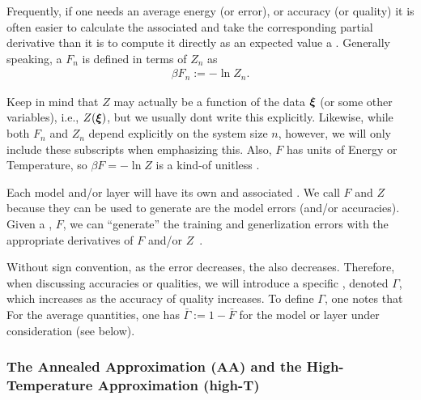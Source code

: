 
Frequently, if one needs an average energy (or error), or accuracy (or quality)
it is often easier to calculate the associated \FreeEnergy and take the corresponding partial derivative
than it is to compute it directly as an expected value a \ThermalAverage.
Generally speaking, a \FreeEnergy $F_n$ is defined in terms of $Z_{n}$ as
\begin{align}
\label{eqn:F}
\beta F_n:=-\ln Z_{n}.
\end{align}


Keep in mind that $Z$ may actually be a function of the data $\boldsymbol{\xi}$ (or some other variables),
i.e., $Z(\boldsymbol{\xi})$, but we usually dont write this explicitly.
Likewise, while  both $F_n$ and $Z_n$ depend explicitly on the system size $n$, however,
we will only include these subscripts when emphasizing this.
Also, $F$ has units of Energy or Temperature, so $\beta F=-\ln Z$ is a kind-of unitless \FreeEnergy.

Each model and/or layer will have its own \PartitionFunction and associated \GeneratingFunctions.
We call $F$ and $Z$ \emph{\GeneratingFunctions} because they can be used to generate are the model errors (and/or accuracies). 
Given a \FreeEnergy, $F$, we can ``generate'' the training and generlization errors with the appropriate derivatives of $F$ and/or $Z$~\cite{LTS90, Solla2023}.

Without sign convention,  as the error decreases, the \FreeEnergy also decreases.
Therefore, when discussing accuracies or qualities,
we will introduce a specific \GeneratingFunction, denoted $\Gamma$, which increases
as the accuracy of quality increases.  To define $\Gamma$, one notes that
For the average quantities, one has
 $\bar{\Gamma}:=1-\bar{F}$ for the model or layer under consideration (see below).


\subsubsection{The Annealed Approximation (AA) and the High-Temperature Approximation (high-T)}
\label{sxn:mathP_annealed}


